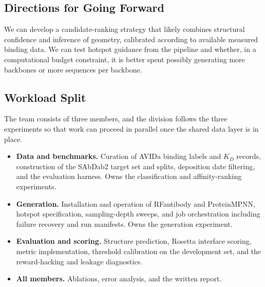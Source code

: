 \subsection{Directions for Going Forward}
We can develop a candidate-ranking strategy that likely combines structural confidence and inference of geometry, calibrated according to available measured binding data. We can test hotspot guidance from the pipeline and whether, in a computational budget constraint, it is better spent possibly generating more backbones or more sequences per backbone. 


\subsection{Workload Split}
The team consists of three members, and the division follows the three experiments so that work can proceed in parallel once the shared data layer is in place.

\begin{itemize}[nosep]
    \item \textbf{Data and benchmarks.} Curation of AVIDa binding labels and $K_D$ records, construction of the SAbDab2 target set and splits, deposition date filtering, and the evaluation harness. Owns the classification and affinity-ranking experiments.
    \item \textbf{Generation.} Installation and operation of RFantibody and ProteinMPNN, hotspot specification, sampling-depth sweeps, and job orchestration including failure recovery and run manifests. Owns the generation experiment.
    \item \textbf{Evaluation and scoring.} Structure prediction, Rosetta interface scoring, metric implementation, threshold calibration on the development set, and the reward-hacking and leakage diagnostics.
    \item \textbf{All members.} Ablations, error analysis, and the written report.
\end{itemize}

